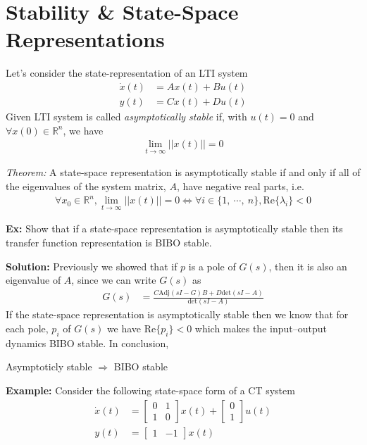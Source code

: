 \documentclass[twoside]{article}
\begin{document}
\newpage

\section{Stability \& State-Space Representations}

Let's consider the state-representation of an LTI system 
%
\begin{align*}
  \dot{x}(t) &= A x(t) + B u(t)
\\
  y(t) &= C x(t) + D u(t)
\end{align*}
%
Given LTI system is called \textit{asymptotically stable} if,
with $u(t) = 0$ and $\forall x(0) \in \mathbb{R}^n$, we have
%
\begin{align*}
  \lim_{t \to \infty} || x(t) || = 0
\end{align*}

\textit{Theorem:} A state-space representation is 
asymptotically stable if and only if all of the eigenvalues
of the system matrix, $A$, have negative real parts, i.e.
%
\begin{align*}
    \forall x_0 \in \mathbb{R}^n, \lim_{t \to \infty} || x(t) || = 0
    \iff \forall i \in \lbrace 1 , \ \cdots ,  \ n \rbrace, \mathrm{Re} \lbrace \lambda_i  \rbrace < 0
\end{align*}
%

\vspace{6pt}

\textbf{Ex:} Show that if a state-space representation is asymptotically stable
then its transfer function representation is BIBO stable.

\vspace{6pt}

\textbf{Solution:} Previously we showed that 
if  $p$ is a pole of $G(s)$, then it is also an
eigenvalue of $A$, since we can write $G(s)$ as 
%
\begin{align*}
 G(s) &= \frac{C \mathrm{Adj} \left(s I - G \right) B + D \mathrm{det}
        \left(s I - A
                               \right)}{\mathrm{det} \left(s I - A
                               \right) }
\end{align*}
%
If the state-space representation is asymptotically stable then
we know that for each pole, $p_i$ of $G(s)$ we have $\mathrm{Re} \lbrace p_i  \rbrace < 0$
which makes the input--output dynamics BIBO stable. In conclusion,

Asymptoticly stable $\Rightarrow$ BIBO stable
%

\textbf{Example:} Consider the following state-space form of a
CT system 
%
\begin{align*}
\dot{x}(t) &= 
\left[ \begin{array}{cc} 0 & 1 \\ 1 & 0 \end{array} \right]
x(t)
+
\left[ \begin{array}{c} 0 \\ 1 \end{array} \right] u(t)
\\
y(t) &= \left[ \begin{array}{cc} 1 & -1 \end{array} \right] x(t)
\end{align*}
\end{document}
